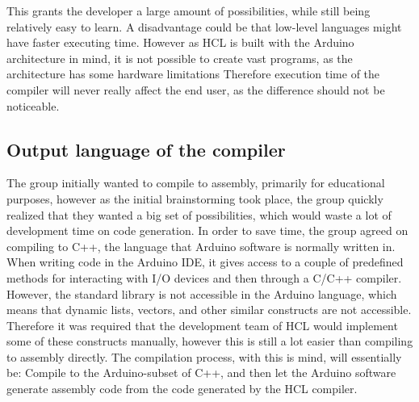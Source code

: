 This grants the developer a large amount of possibilities, while still being relatively easy to learn.
A disadvantage could be that low-level languages might have faster executing time. 
However as HCL is built with the Arduino architecture in mind, it is not possible to create vast programs, as the architecture has some hardware limitations
Therefore execution time of the compiler will never really affect the end user, as the difference should not be noticeable.

\subsection{Output language of the compiler}
The group initially wanted to compile to assembly, primarily for educational purposes, however as the initial brainstorming took place, the group quickly realized that they wanted a big set of possibilities, which would waste a lot of development time on code generation. 
In order to save time, the group agreed on compiling to C++, the language that Arduino software is normally written in.
When writing code in the Arduino IDE, it gives access to a couple of predefined methods for interacting with I/O devices and then through a C/C++ compiler\cite{ArFAQ}.
However, the standard library is not accessible in the Arduino language, which means that dynamic lists, vectors, and other similar constructs are not accessible.
Therefore it was required that the development team of HCL would implement some of these constructs manually, however this is still a lot easier than compiling to assembly directly. 
The compilation process, with this is mind, will essentially be: Compile to the Arduino-subset of C++, and then let the Arduino software generate assembly code from the code generated by the HCL compiler.
